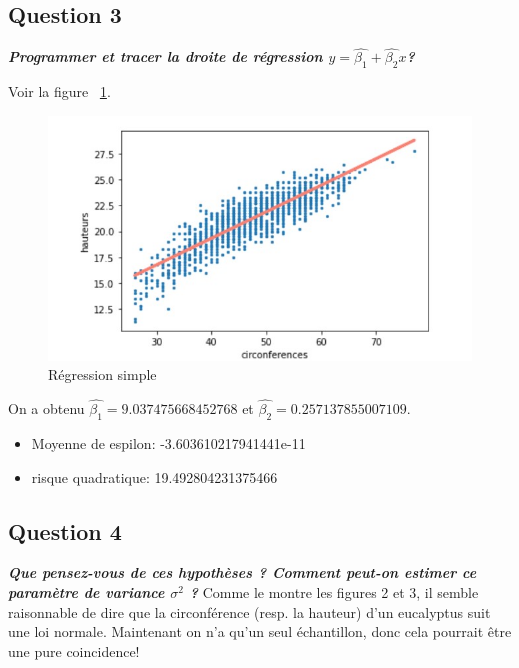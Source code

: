\documentclass[pdflatex]{article}
\theoremstyle{definition}
\newcommand{\quest}[1]{\textbf{\textit{#1}} \vspace{3mm}}
\begin{document}
\subsection*{Question 3}
\quest{Programmer et tracer la droite de r\'egression $y = \hat{\beta_1} + \hat{\beta_2}x$?}

Voir la figure ~\ref{fig:regression simple}.
\begin{figure}
	\includegraphics[scale=1]{regression_simple.jpg}
    \caption{R\'egression simple}
    \label{fig:regression simple}
\end{figure}

On a obtenu $\hat{\beta_1} =  9.037475668452768$  et $\hat{\beta_2} = 0.257137855007109$.

\begin{itemize}
    \item Moyenne de espilon: -3.603610217941441e-11
    \item risque quadratique: 19.492804231375466
\end{itemize}
    
\subsection*{Question 4}
\quest{Que pensez-vous de ces hypoth\`eses ? Comment peut-on estimer ce param\`etre de variance $\sigma^2$ ?}
Comme le montre les figures 2 et 3, il semble raisonnable de dire que la circonf\'erence (resp. la hauteur) d'un eucalyptus suit une loi normale. Maintenant on n'a qu'un seul \'echantillon, donc cela pourrait \^etre une pure coincidence!
\end{document}
